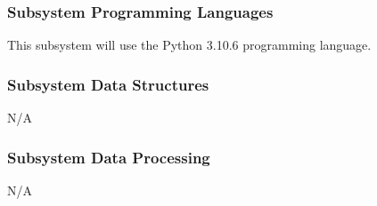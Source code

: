 \subsubsection{Subsystem Programming Languages}
This subsystem will use the Python 3.10.6 programming language.

\subsubsection{Subsystem Data Structures}
N/A

\subsubsection{Subsystem Data Processing}
N/A



